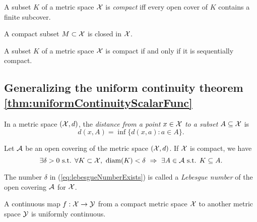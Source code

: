 \begin{defn}
  \label{def:compactness}
  A subset $K$ of a metric space ${\cal X}$ is \emph{compact}
  iff every open cover of $K$ contains a finite subcover.
\end{defn}

\begin{lem}
  \label{lem:compactImpliesClosed}
  A compact subset $M\subset {\cal X}$ is closed in ${\cal X}$.
\end{lem}

\begin{thm}
  \label{thm:compactIsSequCompact}
  A subset $K$ of a metric space ${\cal X}$ is compact
  if and only if it is sequentially compact. 
\end{thm}


\subsection{Generalizing
  the uniform continuity theorem
  \ref{thm:uniformContinuityScalarFunc}}
\label{sec:gener-unif-cont}

\begin{defn}
  \label{def:distancePoint2Set}
  In a metric space $({\cal X},d)$,
  the \emph{distance from a point $x\in{\cal X}$
    to a subset $A\subseteq {\cal X}$} is
  \begin{equation}
    \label{eq:distancePoint2Set}
    d(x,A) = \inf\{d(x,a): a\in A\}.
  \end{equation}
\end{defn}

\begin{lem}
  \label{lem:lebesgueNumberExists}
  Let ${\cal A}$ be an open covering
  of the metric space $({\cal X},d)$. 
  If ${\cal X}$ is compact, we have
  \begin{equation}
    \label{eq:lebesgueNumberExists}
    \exists \delta>0 \text{ s.t. }
    \forall K\subset {\cal X},\
    \text{diam}(K)<\delta\ \Rightarrow\
    \exists A\in{\cal A} \text{ s.t. } K\subseteq A.
  \end{equation}
\end{lem}

\begin{defn}
  \label{def:lebesgueNumber}
  The number $\delta$ in (\ref{eq:lebesgueNumberExists})
  is called a \emph{Lebesgue number}
  of the open covering ${\cal A}$ for ${\cal X}$.
\end{defn}

\begin{thm}
  \label{thm:generalizedUniformContinuity}
  A continuous map $f:{\cal X}\rightarrow {\cal Y}$
  from a compact metric space ${\cal X}$
  to another metric space ${\cal Y}$
  is uniformly continuous.
\end{thm}


